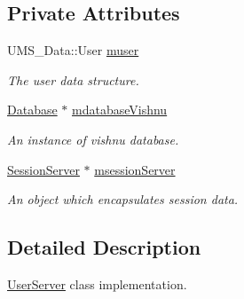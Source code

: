 \subsection*{Private Attributes}
\begin{DoxyCompactItemize}
\item 
\hypertarget{classUserServer_ac6ce31683fb8b809052ddc54f1ec95b4}{
UMS\_\-Data::User \hyperlink{classUserServer_ac6ce31683fb8b809052ddc54f1ec95b4}{muser}}
\label{classUserServer_ac6ce31683fb8b809052ddc54f1ec95b4}

\begin{DoxyCompactList}\small\item\em The user data structure. \item\end{DoxyCompactList}\item 
\hypertarget{classUserServer_a7917e4e9597c28a5170d169e8ef09c9b}{
\hyperlink{classDatabase}{Database} $\ast$ \hyperlink{classUserServer_a7917e4e9597c28a5170d169e8ef09c9b}{mdatabaseVishnu}}
\label{classUserServer_a7917e4e9597c28a5170d169e8ef09c9b}

\begin{DoxyCompactList}\small\item\em An instance of vishnu database. \item\end{DoxyCompactList}\item 
\hypertarget{classUserServer_a74e667762e96a81bc42c686a0e598e09}{
\hyperlink{classSessionServer}{SessionServer} $\ast$ \hyperlink{classUserServer_a74e667762e96a81bc42c686a0e598e09}{msessionServer}}
\label{classUserServer_a74e667762e96a81bc42c686a0e598e09}

\begin{DoxyCompactList}\small\item\em An object which encapsulates session data. \item\end{DoxyCompactList}\end{DoxyCompactItemize}


\subsection{Detailed Description}
\hyperlink{classUserServer}{UserServer} class implementation. 

